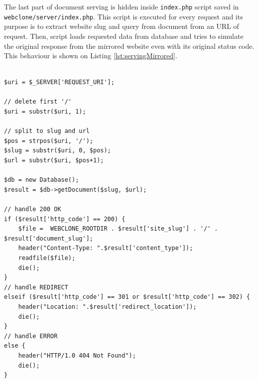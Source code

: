 The last part of document serving is hidden inside \texttt{index.php} script saved in \texttt{webclone/server/index.php}. This script is executed for every request and its purpose is to extract website slug and query from document from an URL of request. Then, script loads requested data from database and tries to simulate the original response from the mirrored website even with its original status code.  This behaviour is shown on Listing \ref{lst:servingMirrored}.

\begin{lstlisting}[caption={Serving of mirrored documents},label={lst:servingMirrored}]

$uri = $_SERVER['REQUEST_URI'];

// delete first '/'
$uri = substr($uri, 1);

// split to slug and url
$pos = strpos($uri, '/');
$slug = substr($uri, 0, $pos);
$url = substr($uri, $pos+1);

$db = new Database();
$result = $db->getDocument($slug, $url);

// handle 200 OK
if ($result['http_code'] == 200) {
    $file =  WEBCLONE_ROOTDIR . $result['site_slug'] . '/' . $result['document_slug'];
    header("Content-Type: ".$result['content_type']);
    readfile($file);
    die();
} 
// handle REDIRECT
elseif ($result['http_code'] == 301 or $result['http_code'] == 302) {
    header("Location: ".$result['redirect_location']);
    die();
}
// handle ERROR
else {
    header("HTTP/1.0 404 Not Found");
    die();
}
\end{lstlisting}

